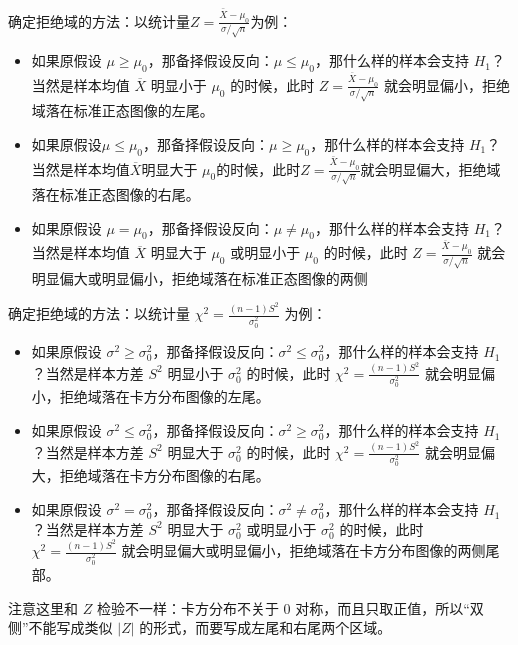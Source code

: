 \documentclass[lang=cn,11pt]{elegantbook}
\begin{document}
\begin{note}
确定拒绝域的方法：以统计量\(Z=\frac{\bar X-\mu_0}{\sigma/\sqrt n}\)为例：
\begin{itemize}
\item 如果原假设 \(\mu\geqslant\mu_0\)，那备择假设反向：\(\mu\leqslant\mu_0\)，那什么样的样本会支持 \(H_1\)？当然是样本均值 \(\overline X\) 明显小于 \(\mu_0\) 的时候，此时 \(Z=\frac{\overline X-\mu_0}{\sigma/\sqrt n}\) 就会明显偏小，拒绝域落在标准正态图像的左尾。
\item 如果原假设\(\mu\leqslant\mu_0\)，那备择假设反向：\(\mu\geqslant\mu_0\)，那什么样的样本会支持 \(H_1\)？当然是样本均值$\overline{X}$明显大于 \(\mu_0\)的时候，此时\(Z=\frac{\bar X-\mu_0}{\sigma/\sqrt n}\)就会明显偏大，拒绝域落在标准正态图像的右尾。
\item 如果原假设 \(\mu=\mu_0\)，那备择假设反向：\(\mu\neq\mu_0\)，那什么样的样本会支持 \(H_1\)？当然是样本均值 \(\overline X\) 明显大于 \(\mu_0\) 或明显小于 \(\mu_0\) 的时候，此时 \(Z=\frac{\overline X-\mu_0}{\sigma/\sqrt n}\) 就会明显偏大或明显偏小，拒绝域落在标准正态图像的两侧
\end{itemize}
确定拒绝域的方法：以统计量 \(\chi^2=\frac{(n-1)S^2}{\sigma_0^2}\) 为例：
\begin{itemize}
\item 如果原假设 \(\sigma^2\geqslant\sigma_0^2\)，那备择假设反向：\(\sigma^2\leqslant\sigma_0^2\)，那什么样的样本会支持 \(H_1\)？当然是样本方差 \(S^2\) 明显小于 \(\sigma_0^2\) 的时候，此时 \(\chi^2=\frac{(n-1)S^2}{\sigma_0^2}\) 就会明显偏小，拒绝域落在卡方分布图像的左尾。
\item 如果原假设 \(\sigma^2\leqslant\sigma_0^2\)，那备择假设反向：\(\sigma^2\geqslant\sigma_0^2\)，那什么样的样本会支持 \(H_1\)？当然是样本方差 \(S^2\) 明显大于 \(\sigma_0^2\) 的时候，此时 \(\chi^2=\frac{(n-1)S^2}{\sigma_0^2}\) 就会明显偏大，拒绝域落在卡方分布图像的右尾。
\item 如果原假设 \(\sigma^2=\sigma_0^2\)，那备择假设反向：\(\sigma^2\neq\sigma_0^2\)，那什么样的样本会支持 \(H_1\)？当然是样本方差 \(S^2\) 明显大于 \(\sigma_0^2\) 或明显小于 \(\sigma_0^2\) 的时候，此时 \(\chi^2=\frac{(n-1)S^2}{\sigma_0^2}\) 就会明显偏大或明显偏小，拒绝域落在卡方分布图像的两侧尾部。
\end{itemize}
注意这里和 \(Z\) 检验不一样：卡方分布不关于 \(0\) 对称，而且只取正值，所以“双侧”不能写成类似 \(|Z|\) 的形式，而要写成左尾和右尾两个区域。
\end{note}
\end{document}
